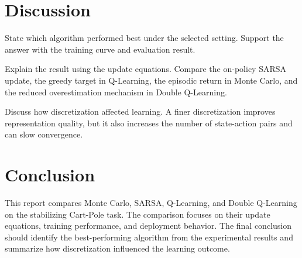 \documentclass[11pt]{article} %
\begin{document}
\section{Discussion}
State which algorithm performed best under the selected setting. Support the answer with the training curve and evaluation result.

Explain the result using the update equations. Compare the on-policy SARSA update, the greedy target in Q-Learning, the episodic return in Monte Carlo, and the reduced overestimation mechanism in Double Q-Learning.

Discuss how discretization affected learning. A finer discretization improves representation quality, but it also increases the number of state-action pairs and can slow convergence.

\section{Conclusion}
This report compares Monte Carlo, SARSA, Q-Learning, and Double Q-Learning on the stabilizing Cart-Pole task. The comparison focuses on their update equations, training performance, and deployment behavior. The final conclusion should identify the best-performing algorithm from the experimental results and summarize how discretization influenced the learning outcome.
\end{document}
